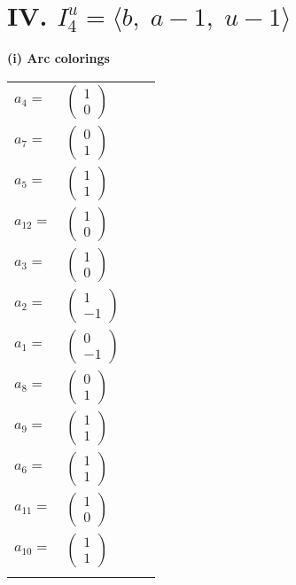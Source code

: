 \documentclass[1p]{elsarticle_modified}
\theoremstyle{definition}
\begin{document}
\centering \section*{IV. $I^u_{4}= \langle b,\;a-1,\;u-1 \rangle$}
\flushleft \textbf{(i) Arc colorings}\\
\begin{tabular}{m{7pt} m{180pt} m{7pt} m{180pt} }
\flushright $a_{4}=$&$\begin{pmatrix}1\\0\end{pmatrix}$ \\
\flushright $a_{7}=$&$\begin{pmatrix}0\\1\end{pmatrix}$ \\
\flushright $a_{5}=$&$\begin{pmatrix}1\\1\end{pmatrix}$ \\
\flushright $a_{12}=$&$\begin{pmatrix}1\\0\end{pmatrix}$ \\
\flushright $a_{3}=$&$\begin{pmatrix}1\\0\end{pmatrix}$ \\
\flushright $a_{2}=$&$\begin{pmatrix}1\\-1\end{pmatrix}$ \\
\flushright $a_{1}=$&$\begin{pmatrix}0\\-1\end{pmatrix}$ \\
\flushright $a_{8}=$&$\begin{pmatrix}0\\1\end{pmatrix}$ \\
\flushright $a_{9}=$&$\begin{pmatrix}1\\1\end{pmatrix}$ \\
\flushright $a_{6}=$&$\begin{pmatrix}1\\1\end{pmatrix}$ \\
\flushright $a_{11}=$&$\begin{pmatrix}1\\0\end{pmatrix}$ \\
\flushright $a_{10}=$&$\begin{pmatrix}1\\1\end{pmatrix}$\\&\end{tabular}
\end{document}
